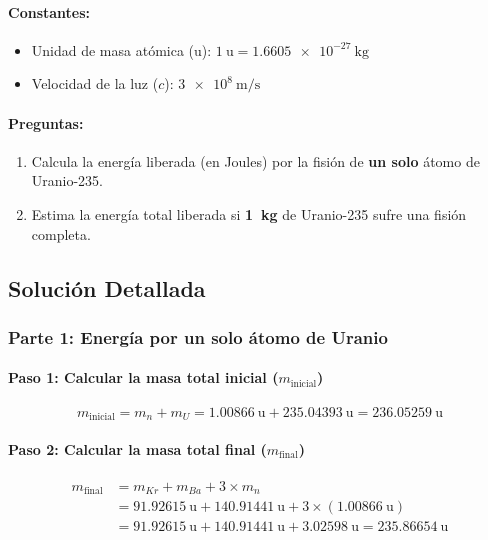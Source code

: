 \documentclass[11pt,a4paper]{article}
\begin{document}
\begin{enumerate}
\paragraph{Constantes:}
\begin{itemize}
    \item Unidad de masa atómica (u): $\SI{1}{\atomicmassunit} = \SI{1.6605e-27}{\kilo\gram}$
    \item Velocidad de la luz ($c$): $\SI{3e8}{\meter\per\second}$
\end{itemize}

\paragraph{Preguntas:}
\begin{enumerate}
    \item Calcula la energía liberada (en Joules) por la fisión de \textbf{un solo} átomo de Uranio-235.
    \item Estima la energía total liberada si \textbf{\SI{1}{\kilo\gram}} de Uranio-235 sufre una fisión completa.
\end{enumerate}

\subsection*{Solución Detallada}

\subsubsection*{Parte 1: Energía por un solo átomo de Uranio}

\paragraph{Paso 1: Calcular la masa total inicial ($m_{\text{inicial}}$)}
\[ m_{\text{inicial}} = m_n + m_U = \SI{1.00866}{\atomicmassunit} + \SI{235.04393}{\atomicmassunit} = \SI{236.05259}{\atomicmassunit} \]

\paragraph{Paso 2: Calcular la masa total final ($m_{\text{final}}$)}
\begin{align*}
    m_{\text{final}} &= m_{Kr} + m_{Ba} + 3 \times m_n \\
    &= \SI{91.92615}{\atomicmassunit} + \SI{140.91441}{\atomicmassunit} + 3 \times (\SI{1.00866}{\atomicmassunit}) \\
    &= \SI{91.92615}{\atomicmassunit} + \SI{140.91441}{\atomicmassunit} + \SI{3.02598}{\atomicmassunit} = \SI{235.86654}{\atomicmassunit}
\end{align*}


\end{enumerate}
\end{document}
